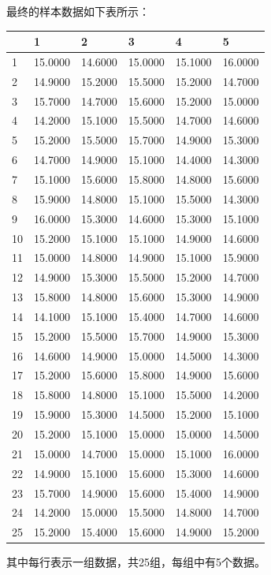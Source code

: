 \documentclass[12pt]{article}  %
\begin{document}
最终的样本数据如下表所示：
\begin{longtable}[]{@{}llllll@{}}
	\toprule\noalign{}
	& 1 & 2 & 3 & 4 & 5 \\
	\midrule\noalign{}
	\endhead
	\bottomrule\noalign{}
	\endlastfoot

	1 & 15.0000 & 14.6000 & 15.0000 & 15.1000 & 16.0000 \\
	2 & 14.9000 & 15.2000 & 15.5000 & 15.2000 & 14.7000 \\
	3 & 15.7000 & 14.7000 & 15.6000 & 15.2000 & 15.0000 \\
	4 & 14.2000 & 15.1000 & 15.5000 & 14.7000 & 14.6000 \\
	5 & 15.2000 & 15.5000 & 15.7000 & 14.9000 & 15.3000 \\
	6 & 14.7000 & 14.9000 & 15.1000 & 14.4000 & 14.3000 \\
	7 & 15.1000 & 15.6000 & 15.8000 & 14.8000 & 15.6000 \\
	8 & 15.9000 & 14.8000 & 15.1000 & 15.5000 & 14.3000 \\
	9 & 16.0000 & 15.3000 & 14.6000 & 15.3000 & 15.1000 \\
	10 & 15.2000 & 15.1000 & 15.1000 & 14.9000 & 14.6000 \\
	11 & 15.0000 & 14.8000 & 14.9000 & 15.1000 & 15.9000 \\
	12 & 14.9000 & 15.3000 & 15.5000 & 15.2000 & 14.7000 \\
	13 & 15.8000 & 14.8000 & 15.6000 & 15.3000 & 14.9000 \\
	14 & 14.1000 & 15.1000 & 15.4000 & 14.7000 & 14.6000 \\
	15 & 15.2000 & 15.5000 & 15.7000 & 14.9000 & 15.3000 \\
	16 & 14.6000 & 14.9000 & 15.0000 & 14.5000 & 14.3000 \\
	17 & 15.2000 & 15.6000 & 15.8000 & 14.9000 & 15.6000 \\
	18 & 15.8000 & 14.8000 & 15.1000 & 15.5000 & 14.2000 \\
	19 & 15.9000 & 15.3000 & 14.5000 & 15.2000 & 15.1000 \\
	20 & 15.2000 & 15.1000 & 15.0000 & 15.0000 & 14.5000 \\
	21 & 15.0000 & 14.7000 & 15.0000 & 15.1000 & 16.0000 \\
	22 & 14.9000 & 15.1000 & 15.6000 & 15.3000 & 14.6000 \\
	23 & 15.7000 & 14.9000 & 15.6000 & 15.4000 & 14.9000\\
	24 & 14.2000 & 15.0000 & 15.5000 & 14.8000 & 14.7000 \\
	25 & 15.2000 & 15.4000 & 15.6000 & 14.9000 & 15.2000 \\
\end{longtable}
其中每行表示一组数据，共25组，每组中有5个数据。
\end{document}
